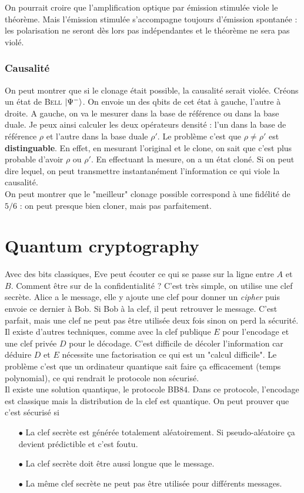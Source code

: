 On pourrait croire que l'amplification optique par émission stimulée viole le théorème. Mais 
l'émission stimulée s'accompagne toujours d'émission spontanée : les polarisation ne seront
dès lors pas indépendantes et le théorème ne sera pas violé.


\subsubsection{Causalité}
On peut montrer que si le clonage était possible, la causalité serait violée. Créons un état
de \textsc{Bell} $\ket{\Psi^-}$. On envoie un des qbits de cet état à gauche, l'autre à droite. 
A gauche, on va le mesurer dans la base de référence ou dans la base duale. Je peux ainsi calculer
les deux opérateurs densité : l'un dans la base de référence $\rho$ et l'autre dans la base
duale $\rho'$. Le problème c'est que $\rho\neq\rho'$ est \textbf{distinguable}. En effet, en mesurant
l'original et le clone, on sait que c'est plus probable d'avoir $\rho$ ou $\rho'$. En effectuant
la mesure, on a un état cloné. Si on peut dire lequel, on peut transmettre instantanément l'information
ce qui viole la causalité.\\

On peut montrer que le "meilleur" clonage possible correspond à une fidélité de $5/6$ : on peut
presque bien cloner, mais pas parfaitement. 


\section{Quantum cryptography}
Avec des bits classiques, Eve peut écouter ce qui se passe sur la ligne entre $A$ et $B$. Comment
être sur de la confidentialité ? C'est très simple, on utilise une clef secrète. Alice a le message, 
elle y ajoute une clef pour donner un \textit{cipher} puis envoie ce dernier à Bob. Si Bob à la clef,
il peut retrouver le message. C'est parfait, mais une clef ne peut pas être utilisée deux fois sinon
on perd la sécurité. Il existe d'autres techniques, comme avec la clef publique $E$ pour l'encodage
et une clef privée $D$ pour le décodage. C'est difficile de décoler l'information car déduire $D$ et
$E$ nécessite une factorisation ce qui est un "calcul difficile". Le problème c'est que un ordinateur
quantique sait faire ça efficacement (temps polynomial), ce qui rendrait le protocole non sécurisé.\\

Il existe une solution quantique, le protocole BB84. Dans ce protocole, l'encodage est classique
mais la distribution de la clef est quantique. On peut prouver que c'est sécurisé si
\begin{itemize}
\item[$\bullet$] La clef secrète est générée totalement aléatoirement. Si pseudo-aléatoire ça devient
prédictible et c'est foutu.
\item[$\bullet$] La clef secrète doit être aussi longue que le message.
\item[$\bullet$] La même clef secrète ne peut pas être utilisée pour différents messages.
\end{itemize}\ 

